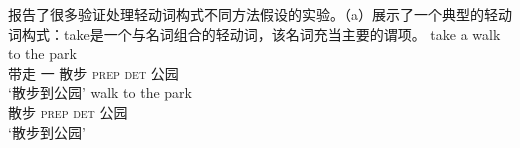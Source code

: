 \begin{exe}
\begin{xlist}[iv.]
\begin{exe}
\begin{xlist}[iv.]
\citet*{WJKP2014a}报告了很多验证处理轻动词构式不同方法假设的实验。（a）展示了一个典型的轻动词构式：take是一个与名词组合的轻动词，该名词充当主要的谓项。
\eal
\ex 
\gll take a walk to the park\\
     带走 一 散步 \textsc{prep} \textsc{det} 公园\\
\glt `散步到公园'
\ex
\gll walk to the park\\
     散步 \textsc{prep} \textsc{det} 公园\\
\glt `散步到公园' 
\zl


\end{xlist}
\end{exe}
\end{xlist}
\end{exe}
